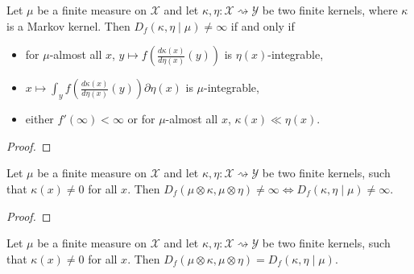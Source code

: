 \begin{lemma}
  \label{lem:condFDiv_ne_top_iff}
  \leanok
  Let $\mu$ be a finite measure on $\mathcal X$ and let $\kappa, \eta : \mathcal X \rightsquigarrow \mathcal Y$ be two finite kernels, where $\kappa$ is a Markov kernel.
  Then $D_f(\kappa, \eta \mid \mu) \ne \infty$ if and only if
  \begin{itemize}
    \item for $\mu$-almost all $x$, $y \mapsto f \left( \frac{d\kappa(x)}{d\eta(x)}(y) \right)$ is $\eta(x)$-integrable,
    \item $x \mapsto \int_y f \left( \frac{d\kappa(x)}{d\eta(x)}(y) \right) \partial \eta(x)$ is $\mu$-integrable,
    \item either $f'(\infty) < \infty$ or for $\mu$-almost all $x$, $\kappa(x) \ll \eta(x)$.
  \end{itemize}
\end{lemma}

\begin{proof} \leanok
{}
\end{proof}

\begin{lemma}
  \label{lem:fDiv_compProd_ne_top_iff}
  \leanok
  Let $\mu$ be a finite measure on $\mathcal X$ and let $\kappa, \eta : \mathcal X \rightsquigarrow \mathcal Y$ be two finite kernels, such that $\kappa(x) \ne 0$ for all $x$.
  Then $D_f(\mu \otimes \kappa, \mu \otimes \eta) \ne \infty \iff D_f(\kappa, \eta \mid \mu) \ne \infty$.
\end{lemma}

\begin{proof} \leanok
{}
\end{proof}

\begin{lemma}
  \label{lem:fDiv_compProd_left}
  \leanok
  Let $\mu$ be a finite measure on $\mathcal X$ and let $\kappa, \eta : \mathcal X \rightsquigarrow \mathcal Y$ be two finite kernels, such that $\kappa(x) \ne 0$ for all $x$.
  Then $D_f(\mu \otimes \kappa, \mu \otimes \eta) = D_f(\kappa, \eta \mid \mu)$.
\end{lemma}


